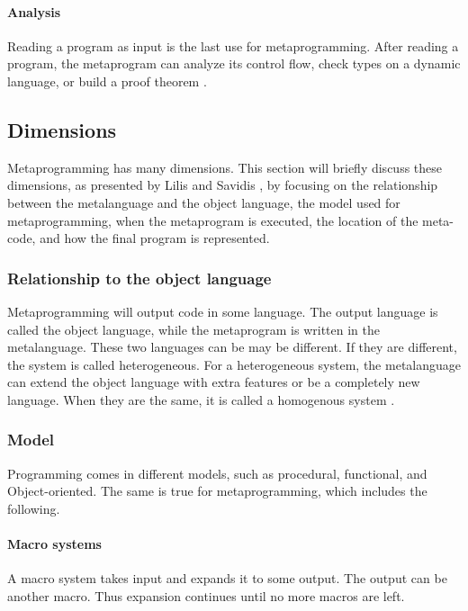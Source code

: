 \paragraph{Analysis}
Reading a program as input is the last use for metaprogramming.
After reading a program, the metaprogram can analyze its control flow, check types on a dynamic language, or build a proof theorem \cite{sheard_01_01}.

\subsection{Dimensions}
Metaprogramming has many dimensions.
This section will briefly discuss these dimensions, as presented by Lilis and Savidis \cite{savidis_19_01}, by focusing on the relationship between the metalanguage and the object language, the model used for metaprogramming, when the metaprogram is executed, the location of the meta-code, and how the final program is represented.

\subsubsection{Relationship to the object language}
Metaprogramming will output code in some language.
The output language is called the object language, while the metaprogram is written in the metalanguage.
These two languages can be may be different.
If they are different, the system is called heterogeneous.
For a heterogeneous system, the metalanguage can extend the object language with extra features or be a completely new language.
When they are the same, it is called a homogenous system \cite{sheard_01_01}.


\subsubsection{Model}
Programming comes in different models, such as procedural, functional, and Object-oriented.
The same is true for metaprogramming, which includes the following.

\paragraph{Macro systems}
A macro system takes input and expands it to some output.
The output can be another macro.
Thus expansion continues until no more macros are left.

